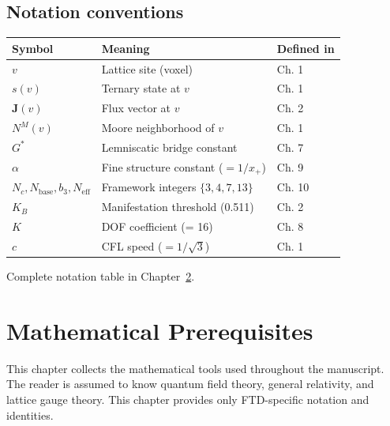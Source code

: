 \documentclass[
  11pt,
  letterpaper,
  twoside,
  openany]{book}
\makeatletter
\let\orig@section\section
\renewcommand{\section}{\needspace{8\baselineskip}\orig@section}
\newcommand{\Gs}{G^{*}{}}
\makeatother
\begin{document}
\section{Notation conventions}\label{notation-conventions}

\begin{longtable}[]{@{}
  >{\raggedright\arraybackslash}p{}
  >{\raggedright\arraybackslash}p{}
  >{\raggedright\arraybackslash}p{}@{}}
\toprule\noalign{}
\begin{minipage}[b]{\linewidth}\raggedright
Symbol
\end{minipage} & \begin{minipage}[b]{\linewidth}\raggedright
Meaning
\end{minipage} & \begin{minipage}[b]{\linewidth}\raggedright
Defined in
\end{minipage} \\
\midrule\noalign{}
\endhead
\bottomrule\noalign{}
\endlastfoot
\(v\) & Lattice site (voxel) & Ch. 1 \\
\(s(v)\) & Ternary state at \(v\) & Ch. 1 \\
\(\mathbf{J}(v)\) & Flux vector at \(v\) & Ch. 2 \\
\(N^M(v)\) & Moore neighborhood of \(v\) & Ch. 1 \\
\(\Gs\) & Lemniscatic bridge constant & Ch. 7 \\
\(\alpha\) & Fine structure constant (\(= 1/x_+\)) & Ch. 9 \\
\(N_c, N_{\text{base}}, b_3, N_{\text{eff}}\) & Framework integers
\(\{3, 4, 7, 13\}\) & Ch. 10 \\
\(K_B\) & Manifestation threshold (0.511) & Ch. 2 \\
\(K\) & DOF coefficient (= 16) & Ch. 8 \\
\(c\) & CFL speed (\(= 1/\sqrt{3}\)) & Ch. 1 \\
\end{longtable}

Complete notation table in Chapter~\ref{sec-prerequisites}.

\chapter{Mathematical Prerequisites}\label{sec-prerequisites}

This chapter collects the mathematical tools used throughout the
manuscript. The reader is assumed to know quantum field theory, general
relativity, and lattice gauge theory. This chapter provides only
FTD-specific notation and identities.
\end{document}
